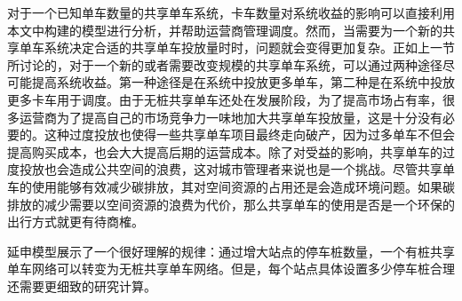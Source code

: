 \documentclass[]{tongjithesis}
\numberwithin{equation}{chapter}
\begin{document}
对于一个已知单车数量的共享单车系统，卡车数量对系统收益的影响可以直接利用本文中构建的模型进行分析，并帮助运营商管理调度。然而，当需要为一个新的共享单车系统决定合适的共享单车投放量时时，问题就会变得更加复杂。正如上一节所讨论的，对于一个新的或者需要改变规模的共享单车系统，可以通过两种途径尽可能提高系统收益。第一种途径是在系统中投放更多单车，第二种是在系统中投放更多卡车用于调度。由于无桩共享单车还处在发展阶段，为了提高市场占有率，很多运营商为了提高自己的市场竞争力一味地加大共享单车投放量，这是十分没有必要的。这种过度投放也使得一些共享单车项目最终走向破产，因为过多单车不但会提高购买成本，也会大大提高后期的运营成本。除了对受益的影响，共享单车的过度投放也会造成公共空间的浪费，这对城市管理者来说也是一个挑战。尽管共享单车的使用能够有效减少碳排放，其对空间资源的占用还是会造成环境问题。如果碳排放的减少需要以空间资源的浪费为代价，那么共享单车的使用是否是一个环保的出行方式就更有待商榷。

延申模型展示了一个很好理解的规律：通过增大站点的停车桩数量，一个有桩共享单车网络可以转变为无桩共享单车网络。但是，每个站点具体设置多少停车桩合理还需要更细致的研究计算。
\end{document}
